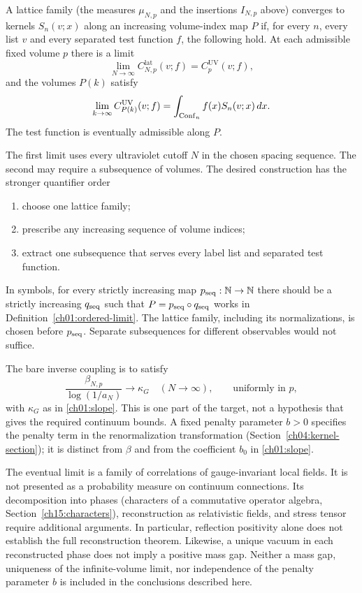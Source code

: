 \begin{definition}
\label{ch01:ordered-limit}
A lattice family (the measures $\mu_{N,p}$ and the insertions $I_{N,p}$ above) converges to kernels $S_n(v;x)$ along an increasing
volume-index map $P$ if, for every $n$, every list $v$ and every separated
test function $f$, the following hold. At each admissible fixed volume $p$ there is
a limit
\begin{equation}
 \lim_{N\to\infty}C^{\mathrm{lat}}_{N,p}(v;f)=C_p^{\mathrm{UV}}(v;f),
 \label{ch01:uv-limit}
\end{equation}
and the volumes $P(k)$ satisfy
\begin{equation}
 \lim_{k\to\infty} C_{P(k)}^{\mathrm{UV}}(v;f)
       =\int_{\operatorname{Conf}_n} f(x)S_n(v;x)\,dx.
 \label{ch01:volume-limit}
\end{equation}
The test function is eventually admissible along $P$.
\end{definition}
The first limit uses every ultraviolet cutoff $N$ in the chosen spacing sequence. The
second may require a subsequence of volumes. The desired construction has
the stronger quantifier order
\begin{enumerate}[label=\textup{(\roman*)}]
\item choose one lattice family;
\item prescribe any increasing sequence of volume indices;
\item extract one subsequence that serves every label list and separated test function.
\end{enumerate}
In symbols, for every strictly increasing map $p_{\rm seq}:\mathbb N\to\mathbb N$
there should be a strictly increasing $q_{\rm seq}$ such that
$P=p_{\rm seq}\circ q_{\rm seq}$ works in
Definition~\ref{ch01:ordered-limit}. The lattice family, including its
normalizations, is chosen before $p_{\rm seq}$. Separate subsequences for
different observables would not suffice.

The bare inverse coupling is to satisfy
\[
 \frac{\beta_{N,p}}{\log(1/a_N)}\longrightarrow\kappa_G
 \quad(N\to\infty),\qquad\text{uniformly in }p,
\]
with $\kappa_G$ as in \eqref{ch01:slope}. This is one part of the target,
not a hypothesis that gives the required continuum bounds. A fixed
penalty parameter $b>0$ specifies the penalty term in the renormalization transformation (Section~\ref{ch04:kernel-section});
it is distinct from $\beta$ and from the coefficient $b_0$ in
\eqref{ch01:slope}.

The eventual limit is a family of correlations of gauge-invariant local
fields. It is not presented as a probability measure on continuum
connections. Its decomposition into phases (characters of a commutative operator algebra, Section~\ref{ch15:characters}), reconstruction as relativistic
fields, and stress tensor require additional arguments. In particular,
reflection positivity alone does not establish the full reconstruction
theorem. Likewise, a unique vacuum in each reconstructed phase does not
imply a positive mass gap. Neither a mass gap, uniqueness of the
infinite-volume limit, nor independence of the penalty parameter $b$ is
included in the conclusions described here.

